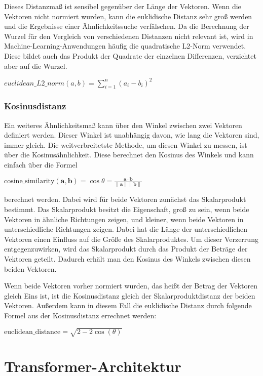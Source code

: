 Dieses Distanzmaß ist sensibel gegenüber der Länge der Vektoren.
Wenn die Vektoren nicht normiert wurden, kann die euklidische Distanz sehr groß werden und die Ergebnisse einer Ähnlichkeitssuche verfälschen.
Da die Berechnung der Wurzel für den Vergleich von verschiedenen Distanzen nicht relevant ist, wird in Machine-Learning-Anwendungen häufig die quadratische L2-Norm verwendet.
Diese bildet auch das Produkt der Quadrate der einzelnen Differenzen, verzichtet aber auf die Wurzel.

$euclidean\_L2\_norm(a,b) = \sum_{i=1}^{n} (a_i-b_i)^2$


\subsubsection{Kosinusdistanz}

Ein weiteres Ähnlichkeitsmaß kann über den Winkel zwischen zwei Vektoren definiert werden.
Dieser Winkel ist unabhängig davon, wie lang die Vektoren sind, immer gleich.
Die weitverbreitetste Methode, um diesen Winkel zu messen, ist über die Kosinusähnlichkeit.
Diese berechnet den Kosinus des Winkels und kann einfach über die Formel

$\text{cosine\_similarity}(\mathbf{a}, \mathbf{b}) = \cos{\theta} = \frac{\mathbf{a} \cdot \mathbf{b}}{\|\mathbf{a}\| \|\mathbf{b}\|}$

berechnet werden.
Dabei wird für beide Vektoren zunächst das Skalarprodukt bestimmt.
Das Skalarprodukt besitzt die Eigenschaft, groß zu sein, wenn beide Vektoren in ähnliche Richtungen zeigen, und kleiner, wenn beide Vektoren in unterschiedliche Richtungen zeigen.
Dabei hat die Länge der unterschiedlichen Vektoren einen Einfluss auf die Größe des Skalarproduktes.
Um dieser Verzerrung entgegenzuwirken, wird das Skalarprodukt durch das Produkt der Beträge der Vektoren geteilt.
Dadurch erhält man den Kosinus des Winkels zwischen diesen beiden Vektoren.

Wenn beide Vektoren vorher normiert wurden, das heißt der Betrag der Vektoren gleich Eins ist, ist die Kosinusdistanz gleich der Skalarproduktdistanz der beiden Vektoren.
Außerdem kann in diesem Fall die euklidische Distanz durch folgende Formel aus der Kosinusdistanz errechnet werden:

$\text{euclidean\_distance} = \sqrt{2 - 2 \cos(\theta)}$
\cite{kryszkiewicz2013}

\section{Transformer-Architektur}

